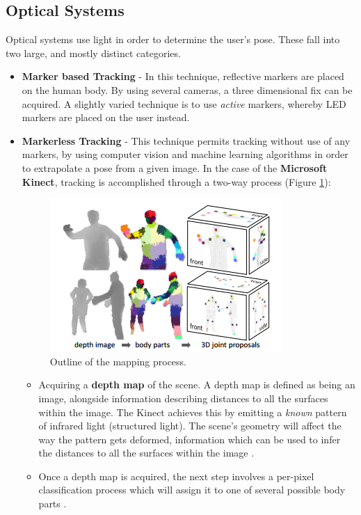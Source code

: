 \documentclass[12p,a4paper]{report}
\begin{document}
\subsection{Optical Systems}
Optical systems use light in order to determine the user's pose. These fall into two large, and mostly distinct categories.
\begin{itemize}
\item \textbf{Marker based Tracking} - In this technique, reflective markers are placed on the human body. By using several cameras, a three dimensional fix can be acquired. A slightly varied technique is to use \emph{active} markers, whereby LED markers are placed on the user instead.

\item \textbf{Markerless Tracking} - This technique permits tracking without use of any markers, by using computer vision and machine learning algorithms in order to extrapolate a pose from a given image. In the case of the \textbf{Microsoft Kinect}, tracking is accomplished through a two-way process (Figure \ref{fig:microsoftkinectbody}):

\begin{figure}[H]
\begin{center}

\includegraphics{kinectbodyparts}
\caption{Outline of the mapping process. \cite{microsoftkinectbody}}
\label{fig:microsoftkinectbody}
\end{center}
\end{figure}
				
	\begin{itemize}
		\item Acquiring a \textbf{depth map} of the scene. A depth map is defined as being an image, alongside information describing distances to all the surfaces within the image. The Kinect achieves this by emitting a \emph{known} pattern of infrared light (structured light). The scene's geometry will affect the way the pattern gets deformed, information which can be used to infer the distances to all the surfaces within the image \cite{microsoftkinectdepth}. 
		\item Once a depth map is acquired, the next step involves a per-pixel classification process which will assign it to one of several possible body parts \cite{microsoftkinectbody}. 
	\end{itemize}
\end{itemize}
\end{document}
